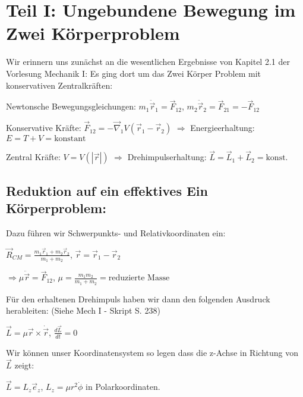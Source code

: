 \documentclass[10pt, letterpaper]{article}
\begin{document}
\section{Teil I: Ungebundene Bewegung im Zwei Körperproblem}

Wir erinnern uns zunächst an die wesentlichen Ergebnisse von Kapitel 2.1 der Vorlesung Mechanik I: Es ging dort um das Zwei Körper Problem mit konservativen Zentralkräften:

Newtonsche Bewegungsgleichungen: $m_1\ddot{\vec{r}}_1 = \vec{F}_{12}$, $m_2\ddot{\vec{r}}_2 = \vec{F}_{21} = -\vec{F}_{12}$

Konservative Kräfte: $\vec{F}_{12} = -\vec{\nabla}_1 V(\vec{r}_1-\vec{r}_2)$
$\Rightarrow$ Energieerhaltung: $E = T + V = \text{konstant}$

Zentral Kräfte: $V = V(|\vec{r}|)$
$\Rightarrow$ Drehimpulserhaltung: $\vec{L} = \vec{L}_1 + \vec{L}_2 = \text{konst.}$

\subsection{Reduktion auf ein effektives Ein Körperproblem:}

\begin{center}
\end{center}
Dazu führen wir Schwerpunkts- und Relativkoordinaten ein:

$\vec{R}_{CM} = \frac{m_1\vec{r}_1 + m_2\vec{r}_2}{m_1+m_2}$, $\vec{r}=\vec{r}_1-\vec{r}_2$

$\Rightarrow \mu \ddot{\vec{r}} = \vec{F}_{12}$, $\mu = \frac{m_1m_2}{m_1+m_2} = \text{reduzierte Masse}$

Für den erhaltenen Drehimpuls haben wir dann den folgenden
Ausdruck herableiten: (Siehe Mech I - Skript S. 238)

$\vec{L} = \mu \vec{r} \times \dot{\vec{r}}$, $\frac{d\vec{L}}{dt} = 0$

Wir können unser Koordinatensystem so legen dass die z-Achse in Richtung von $\vec{L}$ zeigt:

$\vec{L} = L_z \vec{e}_z$, $L_z = \mu r^2\dot{\phi}$ in Polarkoordinaten.
\end{document}
